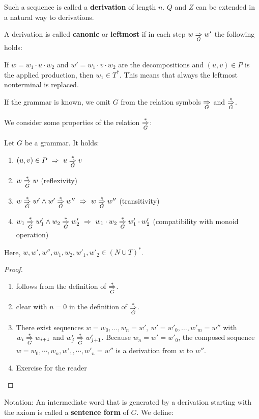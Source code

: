Such a sequence is called a {\bf derivation} of length $n$. $Q$ and $Z$ can be
extended in a natural way to derivations.

A derivation is called {\bf canonic} or {\bf leftmost} if in each step $w
\underset{G}{\Rightarrow} w'$ the following holds:

If $w = w_1 \cdot u \cdot w_2$ and $w' = w_1 \cdot v \cdot w_2$ are the
decompositions and $(u, v) \in P$ is the applied production, then $w_1 \in T^*$.
This means that always the leftmost nonterminal is replaced.

If the grammar is known, we omit $G$ from the relation
symbols $\underset{G}{\Rightarrow}$ and $\underset{{G}}{\overset{*}{\Rightarrow}}$. 

We consider some properties of the relation $\underset{{G}}{\overset{*}{\Rightarrow}}$:

\begin{lemma}
Let $G$ be a grammar. It holds:
\begin{enumerate}
  \item $(u, v) \in P \ \Rightarrow\ u \underset{{G}}{\overset{*}{\Rightarrow}} v$
  \item $w \underset{{G}}{\overset{*}{\Rightarrow}} w$ (reflexivity)
  \item $w \underset{{G}}{\overset{*}{\Rightarrow}} w' \wedge w' \underset{{G}}{\overset{*}{\Rightarrow}} w'' \ \Rightarrow\ w \underset{{G}}{\overset{*}{\Rightarrow}}
  w''$ (transitivity)
  \item $w_1 \underset{{G}}{\overset{*}{\Rightarrow}} w'_1 \wedge w_2 \underset{{G}}{\overset{*}{\Rightarrow}} w'_2\ \Rightarrow\ w_1
  \cdot w_2 \underset{{G}}{\overset{*}{\Rightarrow}} w'_1 \cdot w'_2$ (compatibility with monoid operation)
\end{enumerate}
Here, $w, w', w'', w_1, w_2, w'_1, w'_2 \in (N \cup T)^*$.
\end{lemma}

\begin{proof}\ 

\begin{enumerate}
  \item follows from the definition of $\underset{{G}}{\overset{*}{\Rightarrow}}$.
  \item clear with $n = 0$ in the definition of $\underset{{G}}{\overset{*}{\Rightarrow}}$.
  \item There exist sequences $w = w_0, \ldots, w_n = w',\ w' = w'_0, \ldots,
  w'_m = w''$ with $w_i \underset{{G}}{\overset{*}{\Rightarrow}} w_{i+1}$ and $w'_j \underset{{G}}{\overset{*}{\Rightarrow}} w'_{j+1}$.
  Because $w_n = w' = w'_0$, the composed sequence $w = w_0, \cdots, w_n, w'_1,
  \cdots, w'_n = w''$ is a derivation from $w$ to $w''$.
  \item Exercise for the reader
\end{enumerate}
\end{proof}

Notation: An intermediate word that is generated by a derivation starting with
the axiom is called a {\bf sentence form} of $G$. We define:

